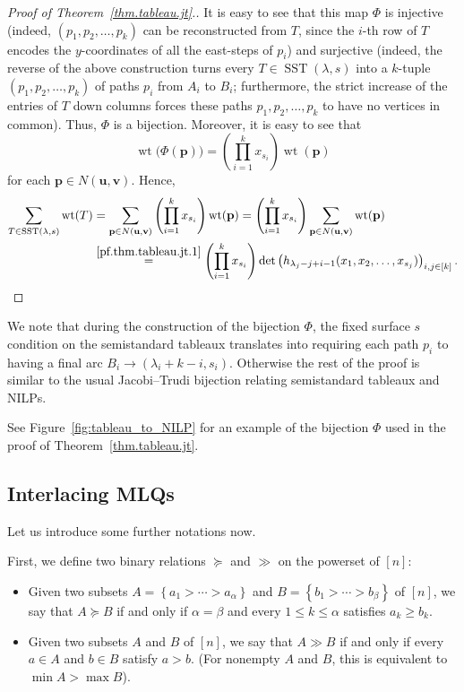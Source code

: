 \documentclass[reqno]{amsart}
\newcommand{\0}{\phantom{c}}
\DeclareMathOperator{\wt}{wt} %
\DeclareMathOperator{\SST}{SST} %
\newcommand{\pp}{\mathbf{p}}
\newcommand{\uu}{\mathbf{u}}
\newcommand{\vv}{\mathbf{v}}
\let\sumnonlimits\sum
\let\prodnonlimits\prod
\renewcommand{\sum}{\sumnonlimits\limits}
\renewcommand{\prod}{\prodnonlimits\limits}
\newenvironment{verlong}{}{}
\newcommand{\set}[1]{\left\{ #1 \right\}}
\newcommand{\tup}[1]{\left( #1 \right)}
\newcommand{\ive}[1]{\left[ #1 \right]}
\newcommand{\defn}[1]{{\color{darkred}\emph{#1}}} %
\theoremstyle{plain}
\theoremstyle{definition}
\numberwithin{equation}{section}
\begin{document}
\begin{verlong}
\begin{proof}[Proof of Theorem~\ref{thm.tableau.jt}.]
It is easy to see that this map $\Phi$ is injective (indeed, $\tup{p_1,p_2,\dotsc,p_k}$ can be reconstructed from $T$, since the $i$-th row of $T$ encodes the $y$-coordinates of all the east-steps of $p_i$) and surjective (indeed, the reverse of the above construction turns every $T \in \SST(\lambda, s)$ into a $k$-tuple $\tup{p_1, p_2, \dotsc, p_k}$ of paths $p_i$ from $A_i$ to $B_i$; furthermore, the strict increase of the entries of $T$ down columns forces these paths $p_1,p_2,\ldots,p_k$ to have no vertices in common).
Thus, $\Phi$ is a bijection.
Moreover, it is easy to see that
\[
\wt\bigl(  \Phi(\pp) \bigr) = \left( \prod_{i=1}^k x_{s_i} \right) \wt(\pp)
\]
for each $\pp \in N(\uu,\vv)$.
Hence,
\begin{align*}
\sum_{T \in \SST(\lambda, s)} \wt(T)  &  = \sum_{\pp\in N(\uu,\vv)  }\left( \prod_{i=1}^k x_{s_i} \right)  \wt(\pp)
= \left( \prod_{i=1}^k x_{s_i} \right) \sum_{\pp\in N(\uu,\vv)  } \wt(\pp) \\
&  \overset{\eqref{pf.thm.tableau.jt.1}}{=} \left(  \prod_{i=1}^k x_{s_i} \right)  \det\left( h_{\lambda_j-j+i-1}(x_1, x_2, \dotsc, x_{s_j}) \right)_{i, j \in \ive{k}}.
\end{align*}
\end{proof}

We note that during the construction of the bijection $\Phi$, the fixed surface $s$ condition on the semistandard tableaux translates into requiring each path $p_i$ to having a final arc $B_i \to (\lambda_i + k - i, s_i)$.
Otherwise the rest of the proof is similar to the usual Jacobi--Trudi bijection relating semistandard tableaux and NILPs.
\end{verlong}

See Figure~\ref{fig:tableau_to_NILP} for an example of the bijection $\Phi$ used in the proof of Theorem~\ref{thm.tableau.jt}.


\subsection{Interlacing MLQs}

Let us introduce some further notations now.

First, we define two binary relations $\succeq$ and $\gg$ on the powerset of $\ive{n}$:

\begin{itemize}
\item Given two subsets $A = \set{a_1 > \cdots > a_{\alpha}}$ and $B = \set{b_1 > \cdots > b_{\beta}}$ of $\ive{n}$, we say that \defn{$A\succeq B$} if and only if $\alpha =\beta$ and every $1 \leq k \leq \alpha$ satisfies $a_k \geq b_k$.

\item Given two subsets $A$ and $B$ of $\ive{n}$, we say that \defn{$A \gg B$} if and only if every $a \in A$ and $b \in B$ satisfy $a > b$. (For nonempty $A$ and $B$, this is equivalent to $\min A > \max B$).
\end{itemize}
\end{document}
